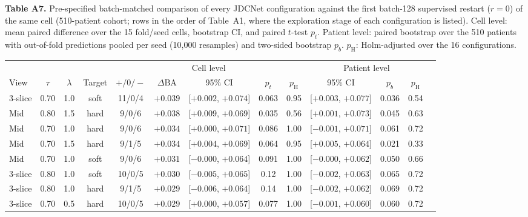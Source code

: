 \documentclass[pdflatex,sn-vancouver,Numbered]{sn-jnl}
\begin{document}
\begin{minipage}{\textwidth}
{\small\noindent\textbf{Table A7.} Pre-specified batch-matched comparison of every JDCNet configuration against the first batch-128 supervised restart ($r{=}0$) of the same cell (510-patient cohort; rows in the order of Table~A1, where the exploration stage of each configuration is listed). Cell level: mean paired difference over the 15 fold/seed cells, bootstrap CI, and paired $t$-test $p_t$. Patient level: paired bootstrap over the 510 patients with out-of-fold predictions pooled per seed (10{,}000 resamples) and two-sided bootstrap $p_b$. $p_{\mathrm{H}}$: Holm-adjusted over the 16 configurations.\par}
\vspace{6pt}


\centering
\scriptsize
\setlength{\tabcolsep}{1.0pt}
\renewcommand{\arraystretch}{0.9}
\begin{tabular*}{\textwidth}{@{\extracolsep{\fill}}lcccccccccccc@{}}
\toprule
 & & & & \multicolumn{5}{c}{Cell level} & \multicolumn{3}{c}{Patient level} \\
\cmidrule(lr){5-9}\cmidrule(l){10-12}
View & $\tau$ & $\lambda$ & Target & $+/0/-$ & $\Delta\mathrm{BA}$ & 95\% CI & $p_t$ & $p_{\mathrm{H}}$ & 95\% CI & $p_b$ & $p_{\mathrm{H}}$ \\
\midrule
3-slice & 0.70 & 1.0 & soft & 11/0/4 & $+0.039$ & [$+0.002$, $+0.074$] & 0.063 & 0.95 & [$+0.003$, $+0.077$] & 0.036 & 0.54 \\
Mid & 0.80 & 1.5 & hard & 9/0/6 & $+0.038$ & [$+0.009$, $+0.069$] & 0.035 & 0.56 & [$+0.001$, $+0.073$] & 0.045 & 0.63 \\
Mid & 0.70 & 1.0 & hard & 9/0/6 & $+0.034$ & [$+0.000$, $+0.071$] & 0.086 & 1.00 & [$-0.001$, $+0.071$] & 0.061 & 0.72 \\
Mid & 0.70 & 1.5 & hard & 9/1/5 & $+0.034$ & [$+0.004$, $+0.069$] & 0.064 & 0.95 & [$+0.005$, $+0.064$] & 0.021 & 0.33 \\
Mid & 0.70 & 1.0 & soft & 9/0/6 & $+0.031$ & [$-0.000$, $+0.064$] & 0.091 & 1.00 & [$-0.000$, $+0.062$] & 0.050 & 0.66 \\
3-slice & 0.80 & 1.0 & soft & 10/0/5 & $+0.030$ & [$-0.005$, $+0.065$] & 0.12 & 1.00 & [$-0.002$, $+0.063$] & 0.065 & 0.72 \\
3-slice & 0.80 & 1.0 & hard & 9/1/5 & $+0.029$ & [$-0.006$, $+0.064$] & 0.14 & 1.00 & [$-0.002$, $+0.062$] & 0.069 & 0.72 \\
3-slice & 0.70 & 0.5 & hard & 10/0/5 & $+0.029$ & [$+0.000$, $+0.057$] & 0.077 & 1.00 & [$-0.001$, $+0.060$] & 0.060 & 0.72 \\

\end{tabular*}
\end{minipage}
\end{document}
